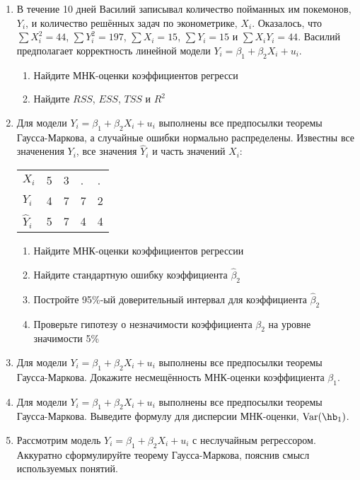 \documentclass[12pt, a4paper]{article}
\theoremstyle{definition}
\begin{document}
\begin{enumerate}

\item В течение 10 дней Василий записывал количество пойманных им покемонов, $Y_i$, и количество решённых задач по эконометрике, $X_i$. Оказалось, что $\sum X_i^2 = 44$, $\sum Y_i^2 = 197$, $\sum X_i = 15 $, $\sum Y_i = 15$ и $\sum X_i Y_i = 44$. Василий предполагает корректность линейной модели $Y_i = \beta_1 + \beta_2 X_i + u_i$.

\begin{enumerate}
\item Найдите МНК-оценки коэффициентов регресси
\item Найдите $RSS$, $ESS$, $TSS$ и $R^2$
\end{enumerate}

 \item Для модели $Y_i = \beta_1 + \beta_2 X_i + u_i$ выполнены все предпосылки теоремы Гаусса-Маркова, а случайные ошибки нормально распределены. Известны все значенения $Y_i$, все значения $\hat Y_i$ и часть значений $X_i$:

\begin{tabular}{lllll}
\toprule
$X_i$      & 5 & 3 & . & . \\
$Y_i$      & 4 & 7 & 7 & 2 \\
$\hat Y_i$ & 5 & 7 & 4 & 4 \\
\bottomrule
\end{tabular}

\begin{enumerate}
\item Найдите МНК-оценки коэффициентов регрессии
\item Найдите стандартную ошибку коэффициента $\hat \beta_2$
\item Постройте 95\%-ый доверительный интервал для коэффициента $\hat \beta_2$
\item Проверьте гипотезу о незначимости коэффициента $\beta_2$ на уровне значимости 5\%
\end{enumerate}

 \item Для модели $Y_i = \beta_1 + \beta_2 X_i + u_i$ выполнены все предпосылки теоремы Гаусса-Маркова. Докажите несмещённость МНК-оценки коэффициента $\beta_1$. \item Для модели $Y_i = \beta_1 + \beta_2 X_i + u_i$ выполнены все предпосылки теоремы Гаусса-Маркова. Выведите формулу для дисперсии МНК-оценки, $\Var(\hb_1)$.

 \item Рассмотрим модель $Y_i = \beta_1 + \beta_2 X_i + u_i$ с неслучайным регрессором. Аккуратно сформулируйте теорему Гаусса-Маркова, пояснив смысл используемых понятий.

\end{enumerate}
\end{document}
